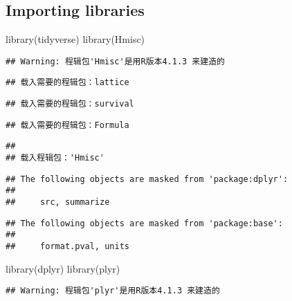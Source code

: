 \documentclass[
]{article}
\newenvironment{Shaded}{\begin{snugshade}}{\end{snugshade}}
\newcommand{\FunctionTok}[1]{\textcolor[rgb]{0.00,0.00,0.00}{#1}}
\newcommand{\NormalTok}[1]{#1}
\begin{document}
\hypertarget{importing-libraries-1}{%
\subsection{Importing libraries}\label{importing-libraries-1}}

\begin{Shaded}
\begin{Highlighting}[]
\FunctionTok{library}\NormalTok{(tidyverse)}
\FunctionTok{library}\NormalTok{(Hmisc)}
\end{Highlighting}
\end{Shaded}

\begin{verbatim}
## Warning: 程辑包'Hmisc'是用R版本4.1.3 来建造的
\end{verbatim}

\begin{verbatim}
## 载入需要的程辑包：lattice
\end{verbatim}

\begin{verbatim}
## 载入需要的程辑包：survival
\end{verbatim}

\begin{verbatim}
## 载入需要的程辑包：Formula
\end{verbatim}

\begin{verbatim}
## 
## 载入程辑包：'Hmisc'
\end{verbatim}

\begin{verbatim}
## The following objects are masked from 'package:dplyr':
## 
##     src, summarize
\end{verbatim}

\begin{verbatim}
## The following objects are masked from 'package:base':
## 
##     format.pval, units
\end{verbatim}

\begin{Shaded}
\begin{Highlighting}[]
\FunctionTok{library}\NormalTok{(dplyr)}
\FunctionTok{library}\NormalTok{(plyr)}
\end{Highlighting}
\end{Shaded}

\begin{verbatim}
## Warning: 程辑包'plyr'是用R版本4.1.3 来建造的
\end{verbatim}
\end{document}
